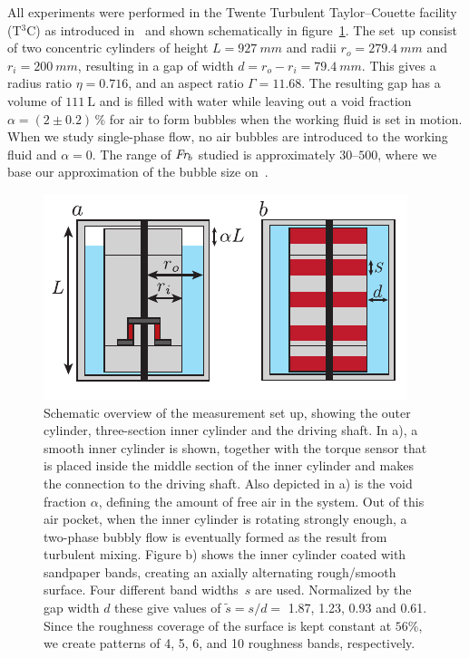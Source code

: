 \documentclass[aps,twocolumn,10pt,floatfix, superscriptaddress,longbibliography,pra]{revtex4-1}
\newcommand\Fr{\mbox{\textit{Fr$_b$}}}  %
\begin{document}
All experiments were performed in the Twente Turbulent Taylor--Couette facility (T$^3$C) as introduced in~\cite{VanGils2011} and shown schematically in figure~\ref{fig:setup}. The set~up consist of two concentric cylinders of height $L = \SI{927}{mm}$ and radii $r_o = \SI{279.4}{mm}$ and $r_i = \SI{200}{mm}$, resulting in a gap of width $d = r_o - r_i = \SI{79.4}{mm}$. This gives a radius ratio $\eta = {0.716}$, and an aspect ratio $\Gamma = 11.68$. The resulting gap has a volume of $\SI{111}{\liter}$ and is filled with water while leaving out a void fraction $\alpha = (2 \pm 0.2)\,\%$ for air to form bubbles when the working fluid is set in motion. When we study single-phase flow, no air bubbles are introduced to the working fluid and $\alpha = 0$. The range of $\Fr$ studied is approximately $\numrange{30}{500}$, where we base our approximation of the bubble size on~\cite{vanGils2013}.

\begin{figure}[ht]
\centering
\includegraphics[scale=1.2]{./figures/fig1_setup}
\caption{Schematic overview of the measurement set up, showing the outer cylinder, three-section inner cylinder and the driving shaft. In a), a smooth inner cylinder is shown, together with the torque sensor that is placed inside the middle section of the inner cylinder and makes the connection to the driving shaft. Also depicted in a) is the void fraction $\alpha$, defining the amount of free air in the system. Out of this air pocket, when the inner cylinder is rotating strongly enough, a two-phase bubbly flow is eventually formed as the result from turbulent mixing. Figure b) shows the inner cylinder coated with sandpaper bands, creating an axially alternating rough/smooth surface. Four different band widths~$s$ are used. Normalized by the gap width $d$ these give values of $\tilde{s} = s/d =$ 1.87, 1.23, 0.93 and 0.61. Since the roughness coverage of the surface is kept constant at $56\%$, we create patterns of 4, 5, 6, and 10 roughness bands, respectively.}\label{fig:setup}
\end{figure}
\end{document}
